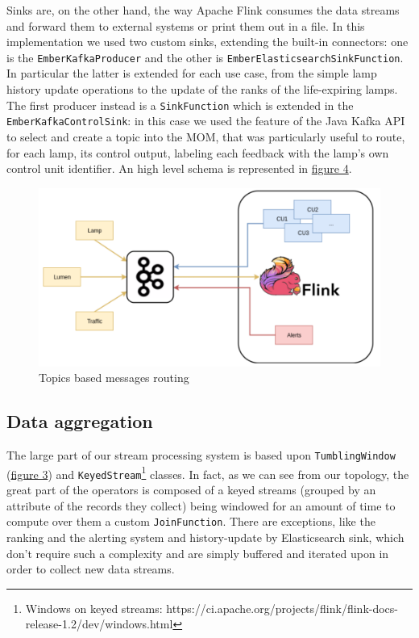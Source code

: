 Sinks are, on the other hand, the way Apache Flink consumes the data streams and forward them to external systems or print them out in a file. In this implementation we used two custom sinks, extending the built-in connectors: one is the \texttt{EmberKafkaProducer} and the other is \texttt{EmberElasticsearchSinkFunction}. In particular the latter is extended for each use case, from the simple lamp history update operations to the update of the ranks of the life-expiring lamps. The first producer instead is a \texttt{SinkFunction} which is extended in the \texttt{EmberKafkaControlSink}: in this case we used the feature of the Java Kafka API to select and create a topic into the MOM, that was particularly useful to route, for each lamp, its control output, labeling each feedback with the lamp's own control unit identifier. An high level schema is represented in \hyperref[fig:ember_kafkatopology]{figure 4}.

\begin{figure}[!b]
\begin{center}
	\includegraphics[scale=0.40]{img/ember_kafkatopology}
	\caption{Topics based messages routing}
	\label{fig:ember_kafkatopology}
\end{center}
\end{figure}


\subsection{Data aggregation}
The large part of our stream processing system is based upon \texttt{TumblingWindow} (\hyperref[fig:flink_windows]{figure 3}) and \texttt{KeyedStream}\footnote{Windows on keyed streams: https://ci.apache.org/projects/flink/flink-docs-release-1.2/dev/windows.html} classes. In fact, as we can see from our topology, the great part of the operators is composed of a keyed streams (grouped by an attribute of the records they collect) being windowed for an amount of time to compute over them a custom \texttt{JoinFunction}. There are exceptions, like the ranking and the alerting system and history-update by Elasticsearch sink, which don't require such a complexity and are simply buffered and iterated upon in order to collect new data streams. 

